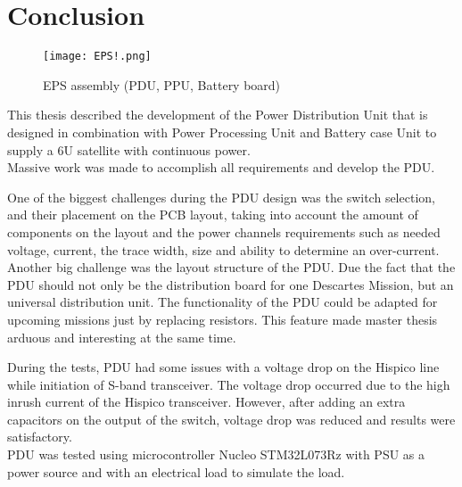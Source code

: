 \chapter{Conclusion\label{cha:chapter7}}

 \begin{figure}[h]
 	\centering
 	\texttt{[image: EPS!.png]}
 	\caption{EPS assembly (PDU, PPU, Battery board)}
 	\label{fig: EPS!}
 \end{figure}

This thesis described the development of the Power Distribution Unit that is designed in combination with Power Processing Unit and Battery case Unit to supply a 6U satellite with  continuous power.\\  


Massive work was made to accomplish all requirements and develop the PDU.
 

 One of the biggest challenges during the PDU design was the switch selection, and their placement on the PCB layout, taking into account the amount of components on the layout and the power channels requirements such as needed voltage, current, the trace width, size and ability to determine an over-current. Another big challenge was the layout structure of the PDU. Due the fact that the PDU should not only be the distribution board for one Descartes Mission, but an universal distribution unit. The functionality of the PDU could be adapted for upcoming missions just by replacing resistors. This feature made master thesis arduous and interesting at the same time.
 
  During the tests, PDU had some issues with a voltage drop on the Hispico line while initiation of S-band transceiver. The voltage drop occurred due to the high inrush current of the Hispico transceiver.    However, after adding an extra capacitors on the output of the switch, voltage drop was reduced and results were satisfactory.    \\ 

PDU was tested using microcontroller Nucleo STM32L073Rz with PSU as a power source and with an electrical load to simulate the load. 

